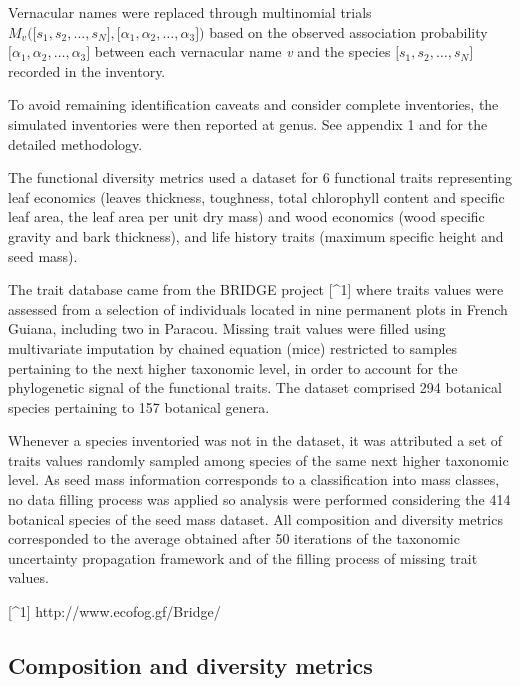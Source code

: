 \documentclass[fleqn,10pt]{ArtEcoFoG} %
\theoremstyle{definition}
\theoremstyle{definition}
\theoremstyle{definition}
\theoremstyle{remark}
\begin{document}
Vernacular names were replaced through multinomial trials
\(M_v\Big(\big[s_1, s_2, …, s_N\big],\big[\alpha_1, \alpha_2,…, \alpha_3\big]\Big)\)
based on the observed association probability
\(\big[\alpha_1, \alpha_2,…, \alpha_3\big]\) between each vernacular
name \emph{v} and the species \(\big[s_1, s_2, …, s_N\big]\) recorded in
the inventory.

To avoid remaining identification caveats and consider complete
inventories, the simulated inventories were then reported at genus. See
appendix 1 and \citet{Aubry-Kientz2013} for the detailed methodology.

The functional diversity metrics used a dataset for 6 functional traits
representing leaf economics (leaves thickness, toughness, total
chlorophyll content and specific leaf area, the leaf area per unit dry
mass) and wood economics (wood specific gravity and bark thickness), and
life history traits (maximum specific height and seed mass).

The trait database came from the BRIDGE project {[}\^{}1{]} where traits
values were assessed from a selection of individuals located in nine
permanent plots in French Guiana, including two in Paracou. Missing
trait values were filled using multivariate imputation by chained
equation (mice) restricted to samples pertaining to the next higher
taxonomic level, in order to account for the phylogenetic signal of the
functional traits. The dataset comprised 294 botanical species
pertaining to 157 botanical genera.

Whenever a species inventoried was not in the dataset, it was attributed
a set of traits values randomly sampled among species of the same next
higher taxonomic level. As seed mass information corresponds to a
classification into mass classes, no data filling process was applied so
analysis were performed considering the 414 botanical species of the
seed mass dataset. All composition and diversity metrics corresponded to
the average obtained after 50 iterations of the taxonomic uncertainty
propagation framework and of the filling process of missing trait
values.

{[}\^{}1{]} http://www.ecofog.gf/Bridge/

\subsection{Composition and diversity
metrics}\label{composition-and-diversity-metrics}
\end{document}

